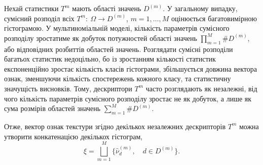 Нехай статистики $T^m$ мають області значень $D^{(m)}$. 
У загальному випадку, сумісний розподіл всіх $T^m\colon\ \Omega \to D^{(m)}$, $m=1,\dots,M$ оцінюється багатовимірною гістограмою. 
У мультиноміальній моделі, кількість параметрів сумісного розподілу зростатиме як добуток потужностей області значень $\prod_{m=1}^M \# D^{(m)}$, або відповідних розбиттів областей значень.
Розглядати сумісні розподіли багатьох статистик недоцільно, бо із зростанням кількості статистик експоненційно зростає кількість класів гістограми, 
збільшується довжина вектора ознак, зменшуючи кількість спостережень кожного класу, та статистичну значущість висновків.
Тому, дескриптори $T^m$ часто розглядають як незалежні, від чого кількість параметрів сумісного розподілу зростає не як добуток, 
а лише як сума розмірів областей значень $\sum_{m=1}^M \# D^{(m)}$.

Отже, вектор ознак текстури згідно декількох незалежних дескрипторів $T^m$ можна утворити конкатенацією декількох гістограм,
\begin{equation*}
    \xi = \bigsqcup_{m=1}^M \{\hat \nu^{(m)}_d, \quad d\in D^{(m)}\}.
\end{equation*}




